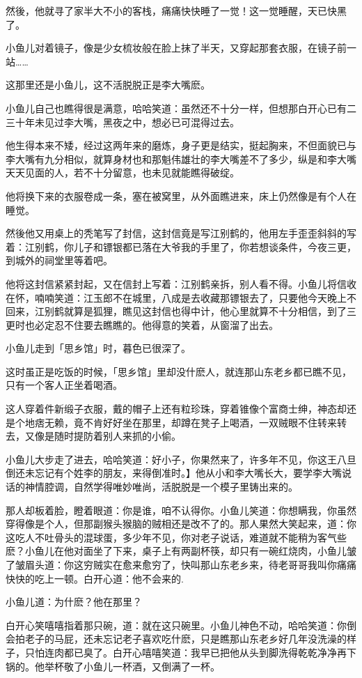 \documentclass[12pt,oneside]{book}
\begin{document}
然後，他就寻了家半大不小的客栈，痛痛快快睡了一觉！这一觉睡醒，天已快黑了。

小鱼儿对着镜子，像是少女梳妆般在脸上抹了半天，又穿起那套衣服，在镜子前一站\ldots\ldots{}

这那里还是小鱼儿，这不活脱脱正是李大嘴麽。

小鱼儿自己也瞧得很是满意，哈哈笑道：虽然还不十分一样，但想那白开心已有二三十年未见过李大嘴，黑夜之中，想必已可混得过去。

他生得本来不矮，经过这两年来的磨炼，身子更是结实，挺起胸来，不但面貌已与李大嘴有九分相似，就算身材也和那魁伟雄壮的李大嘴差不了多少，纵是和李大嘴天天见面的人，若不十分留意，也未见就能瞧得破绽。

他将换下来的衣服卷成一条，塞在被窝里，从外面瞧进来，床上仍然像是有个人在睡觉。

然後他又用桌上的秃笔写了封信，这封信竟是写江别鹤的，他用左手歪歪斜斜的写着：江别鹤，你儿子和镖银都已落在大爷我的手里了，你若想谈条件，今夜三更，到城外的祠堂里等着吧。

他将这封信紧紧封起，又在信封上写着：江别鹤亲拆，别人看不得。小鱼儿将信收在怀，喃喃笑道：江玉郎不在城里，八成是去收藏那镖银去了，只要他今天晚上不回来，江别鹤就算是狐狸，瞧见这封信也得中计，他心里就算不十分相信，到了三更时也必定忍不住要去瞧瞧的。他得意的笑着，从窗溜了出去。

小鱼儿走到「思乡馆」时，暮色已很深了。

这时虽正是吃饭的时候，「思乡馆」里却没什麽人，就连那山东老乡都已瞧不见，只有一个客人正坐着喝酒。

这人穿着件新缎子衣服，戴的帽子上还有粒珍珠，穿着锥像个富商士绅，神态却还是个地痞无赖，竟不肯好好坐在那里，却蹲在凳子上喝酒，一双贼眼不住转来转去，又像是随时提防着别人来抓的小偷。

小鱼儿大步走了进去，哈哈笑道：好小子，你果然来了，许多年不见，你这王八旦倒还未忘记有个姓李的朋友，来得倒准时。】他从小和李大嘴长大，要学李大嘴说话的神情腔调，自然学得唯妙唯尚，活脱脱是一个模子里铸出来的。

那人却板着脸，瞪着眼道：你是谁，咱不认得你。小鱼儿笑道：你想瞒我，你虽然穿得像是个人，但那副猴头猴脑的贼相还是改不了的。那人果然大笑起来，道：你这吃人不吐骨头的混球蛋，多少年不见，你对老子说话，难道就不能稍为客气些麽？小鱼儿在他对面坐了下来，桌子上有两副杯筷，却只有一碗红烧肉，小鱼儿皱了皱眉头道：你这穷贼实在愈来愈穷了，快叫那山东老乡来，待老哥哥我叫你痛痛快快的吃上一顿。白开心道：他不会来的.

小鱼儿道：为什麽？他在那里？

白开心笑嘻嘻指着那只碗，道：就在这只碗里。小鱼儿神色不动，哈哈笑道：你倒会拍老子的马屁，还未忘记老子喜欢吃什麽，只是瞧那山东老乡好几年没洗澡的样子，只怕连肉都已臭了。白开心嘻嘻笑道：我早已把他从头到脚洗得乾乾净净再下锅的。他举杯敬了小鱼儿一杯酒，又倒满了一杯。
\end{document}
